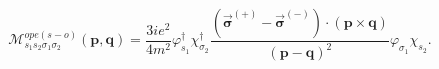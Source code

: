 \begin{equation}
\mathcal{M}_{s_{1}s_{2}\sigma _{1}\sigma _{2}}^{ope\left( s-o\right) }(%
\mathbf{p},\mathbf{q})=\frac{3ie^{2}}{4m^{2}}\varphi _{s_{1}}^{\dagger }\chi
_{\sigma _{2}}^{\dagger }\frac{\left( \overrightarrow{\mathbf{\sigma }}%
^{\left( +\right) }-\overrightarrow{\mathbf{\sigma }}^{\left( -\right)
}\right) \cdot \left( \mathbf{p\times q}\right) }{\left( \mathbf{p-q}\right)
^{2}}\varphi _{\sigma _{1}}\chi _{s_{2}}.
\end{equation}

